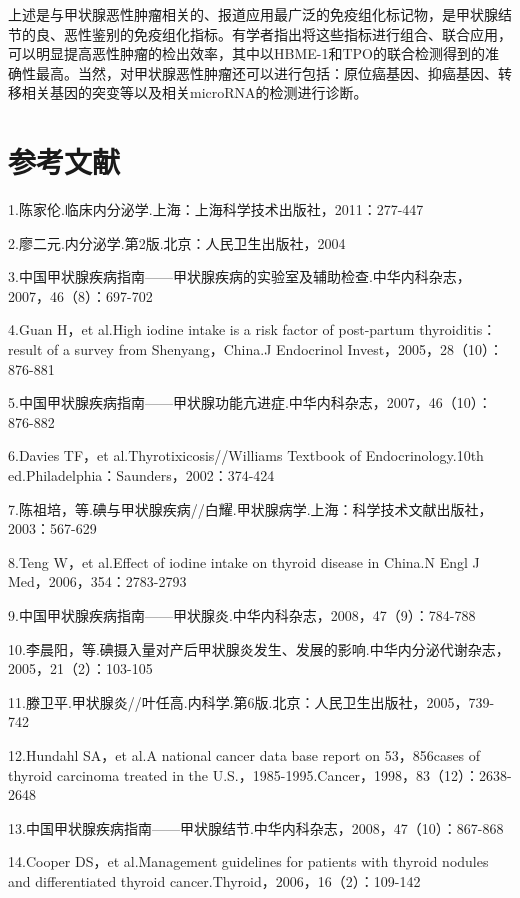 上述是与甲状腺恶性肿瘤相关的、报道应用最广泛的免疫组化标记物，是甲状腺结节的良、恶性鉴别的免疫组化指标。有学者指出将这些指标进行组合、联合应用，可以明显提高恶性肿瘤的检出效率，其中以HBME-1和TPO的联合检测得到的准确性最高。当然，对甲状腺恶性肿瘤还可以进行包括：原位癌基因、抑癌基因、转移相关基因的突变等以及相关microRNA的检测进行诊断。

\protect\hypertarget{text00305.html}{}{}

\section{参考文献}

1.陈家伦.临床内分泌学.上海：上海科学技术出版社，2011：277-447

2.廖二元.内分泌学.第2版.北京：人民卫生出版社，2004

3.中国甲状腺疾病指南------甲状腺疾病的实验室及辅助检查.中华内科杂志，2007，46（8）：697-702

4.Guan H，et al.High iodine intake is a risk factor of post-partum
thyroiditis：result of a survey from Shenyang，China.J Endocrinol
Invest，2005，28（10）：876-881

5.中国甲状腺疾病指南------甲状腺功能亢进症.中华内科杂志，2007，46（10）：876-882

6.Davies TF，et al.Thyrotixicosis//Williams Textbook of
Endocrinology.10th ed.Philadelphia：Saunders，2002：374-424

7.陈祖培，等.碘与甲状腺疾病//白耀.甲状腺病学.上海：科学技术文献出版社，2003：567-629

8.Teng W，et al.Effect of iodine intake on thyroid disease in China.N
Engl J Med，2006，354：2783-2793

9.中国甲状腺疾病指南------甲状腺炎.中华内科杂志，2008，47（9）：784-788

10.李晨阳，等.碘摄入量对产后甲状腺炎发生、发展的影响.中华内分泌代谢杂志，2005，21（2）：103-105

11.滕卫平.甲状腺炎//叶任高.内科学.第6版.北京：人民卫生出版社，2005，739-742

12.Hundahl SA，et al.A national cancer data base report on 53，856cases
of thyroid carcinoma treated in the
U.S.，1985-1995.Cancer，1998，83（12）：2638-2648

13.中国甲状腺疾病指南------甲状腺结节.中华内科杂志，2008，47（10）：867-868

14.Cooper DS，et al.Management guidelines for patients with thyroid
nodules and differentiated thyroid
cancer.Thyroid，2006，16（2）：109-142

